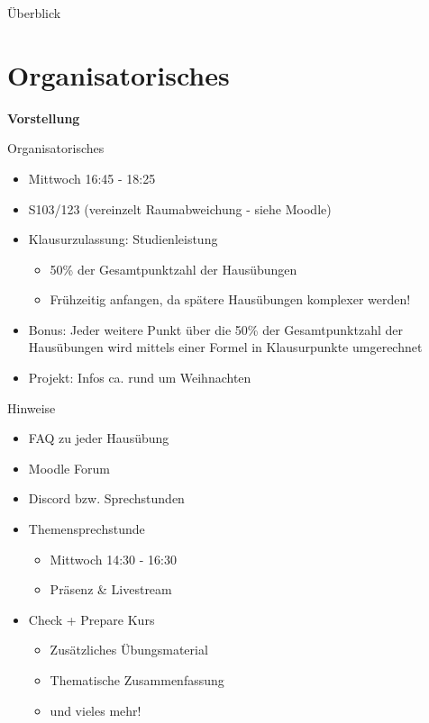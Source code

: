 \documentclass{../tuda-beamer}
\date{27. Oktober 2021}
\begin{document}
  \maketitle

  \begin{frame}{Überblick}
    \tableofcontents
  \end{frame}


  \section{Organisatorisches}
  \begin{frame}[c]
    \begin{center}
      \textbf{\LARGE Vorstellung}
    \end{center}
  \end{frame}

  \begin{frame}{Organisatorisches}
    \begin{itemize}
      \item Mittwoch 16:45 - 18:25
      \item S103/123 (vereinzelt Raumabweichung - siehe Moodle)
      \item Klausurzulassung: Studienleistung
      \begin{itemize}
        \item 50\% der Gesamtpunktzahl der Hausübungen
        \item Frühzeitig anfangen, da spätere Hausübungen komplexer werden!
      \end{itemize}
      \item Bonus: Jeder weitere Punkt über die 50\% der Gesamtpunktzahl der Hausübungen wird
      mittels einer Formel in Klausurpunkte umgerechnet
      \item Projekt: Infos ca. rund um Weihnachten
    \end{itemize}
  \end{frame}

  \begin{frame}{Hinweise}
    \begin{itemize}
      \item FAQ zu jeder Hausübung
      \item Moodle Forum
      \item Discord bzw. Sprechstunden
      \item Themensprechstunde
      \begin{itemize}
        \item Mittwoch 14:30 - 16:30
        \item Präsenz \& Livestream
      \end{itemize}
      \item Check + Prepare Kurs
      \begin{itemize}
        \item Zusätzliches Übungsmaterial
        \item Thematische Zusammenfassung
        \item und vieles mehr!
      \end{itemize}
    \end{itemize}
  \end{frame}
\end{document}
